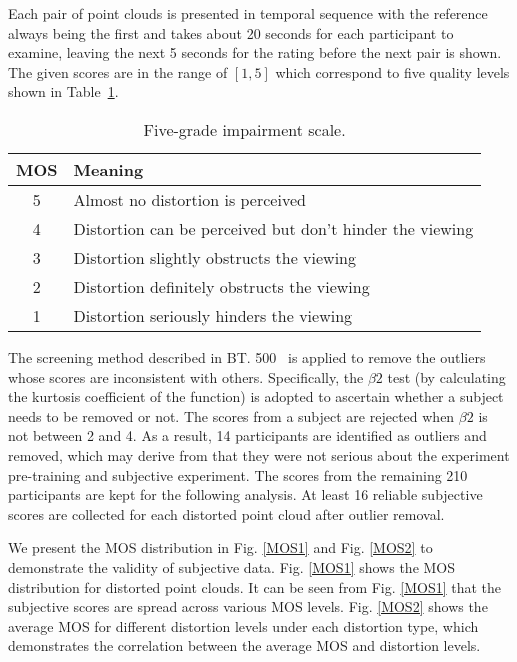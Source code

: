 \documentclass[acmsmall]{acmart}
\begin{document}
\par Each pair of point clouds is presented in temporal sequence with the reference always being the first and takes about 20 seconds for each participant to examine, leaving the next 5 seconds for the rating before the next pair is shown. The given scores are in the range of $[1,5]$ which correspond to five quality levels shown in Table~\ref{Score}.

\begin{table}[htbp]
  \centering
  \caption{Five-grade impairment scale.}
  \begin{footnotesize}
    \begin{tabular}{c|l}
    \hline
    MOS     & Meaning \\
    \hline
    5     & Almost no distortion is perceived \\
    \hline
    4     & Distortion can be perceived but don't hinder the viewing \\
    \hline
    3     & Distortion slightly obstructs the viewing \\
    \hline
    2     & Distortion definitely obstructs the viewing \\
    \hline
    1     & Distortion seriously hinders the viewing \\
    \hline
    \end{tabular}\end{footnotesize}
  \label{Score}\end{table}

\par The screening method described in BT. 500~\cite{BT500} is applied to remove the outliers whose scores are inconsistent with others. Specifically, the $\beta2$ test (by calculating the kurtosis coefficient of the function) is adopted to ascertain whether a subject needs to be removed or not. The scores from a subject are rejected when $\beta2$ is not between 2 and 4. As a result, 14 participants are identified as outliers and removed, which may derive from that they were not serious about the experiment pre-training and subjective experiment. The scores from the remaining 210 participants are kept for the following analysis. At least 16 reliable subjective scores are collected for each distorted point cloud after outlier removal.

\par We present the MOS distribution in Fig. \ref{MOS1} and Fig. \ref{MOS2} to demonstrate the validity of subjective data. Fig. \ref{MOS1} shows the MOS distribution for distorted point clouds. It can be seen from Fig. \ref{MOS1} that the subjective scores are spread across various MOS levels. Fig. \ref{MOS2} shows the average MOS for different distortion levels under each distortion type, which demonstrates the correlation between the average MOS and distortion levels.
\end{document}
